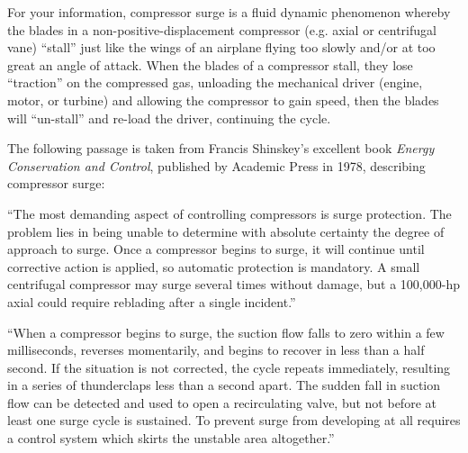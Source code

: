 \vskip 10pt

For your information, compressor surge is a fluid dynamic phenomenon whereby the blades in a non-positive-displacement compressor (e.g. axial or centrifugal vane) ``stall'' just like the wings of an airplane flying too slowly and/or at too great an angle of attack.  When the blades of a compressor stall, they lose ``traction'' on the compressed gas, unloading the mechanical driver (engine, motor, or turbine) and allowing the compressor to gain speed, then the blades will ``un-stall'' and re-load the driver, continuing the cycle.

The following passage is taken from Francis Shinskey's excellent book {\it Energy Conservation and Control}, published by Academic Press in 1978, describing compressor surge:

\vskip 10pt {\narrower \noindent \baselineskip5pt

``The most demanding aspect of controlling compressors is surge protection.  The problem lies in being unable to determine with absolute certainty the degree of approach to surge.  Once a compressor begins to surge, it will continue until corrective action is applied, so automatic protection is mandatory.  A small centrifugal compressor may surge several times without damage, but a 100,000-hp axial could require reblading after a single incident.''

\vskip 5pt

``When a compressor begins to surge, the suction flow falls to zero within a few milliseconds, reverses momentarily, and begins to recover in less than a half second.  If the situation is not corrected, the cycle repeats immediately, resulting in a series of thunderclaps less than a second apart.  The sudden fall in suction flow can be detected and used to open a recirculating valve, but not before at least one surge cycle is sustained.  To prevent surge from developing at all requires a control system which skirts the unstable area altogether.''

\par} \vskip 10pt











